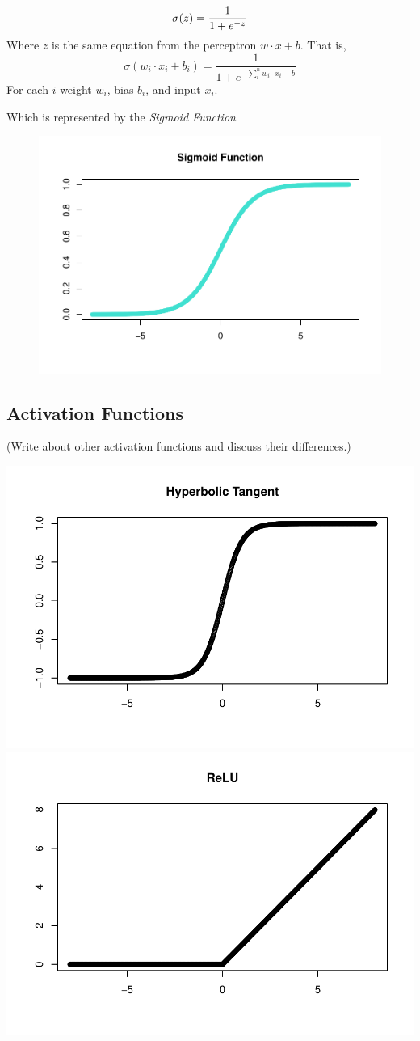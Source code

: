 \[
\sigma(z) = \frac{1}{1+e^{-z}} \\
\] Where \(z\) is the same equation from the perceptron
\(w \cdot x + b\). That is, \[
\sigma(w_i \cdot x_i + b_i) = \frac{1}{1+e^{-\sum_i^n w_i \cdot x_i - b}}
\] For each \(i\) weight \(w_i\), bias \(b_i\), and input \(x_i\).

Which is represented by the \emph{Sigmoid Function}

\begin{figure}
    \centering
    \includegraphics[width = .7\textwidth]{Figures/sigmoid-function-1.pdf}
\end{figure}


\hypertarget{activation-functions}{%
\subsection{Activation Functions}\label{activation-functions}}

(Write about other activation functions and discuss their differences.)

\includegraphics[width=0.5\linewidth]{ANN_files/figures-side-1}
\includegraphics[width=0.5\linewidth]{ANN_files/figures-side-2}

